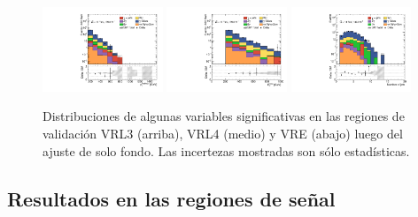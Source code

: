 \begin{figure}[ht!]
    \includegraphics[width=0.32\textwidth]{images/results/fr2_unblind/can_VRE_ph_pt0_afterFit.pdf}
    \includegraphics[width=0.32\textwidth]{images/results/fr2_unblind/can_VRE_met_et_afterFit.pdf}
    \includegraphics[width=0.32\textwidth]{images/results/fr2_unblind/can_VRE_jet_n_afterFit.pdf}

    
    \caption{Distribuciones de algunas variables significativas en las regiones de validación VRL3 (arriba), VRL4 (medio) y VRE (abajo) luego del ajuste de solo fondo. Las incertezas mostradas son sólo estadísticas.}
    \label{fig:dist_vrle_bkgonly}
\end{figure}






\subsection{Resultados en las regiones de señal}

